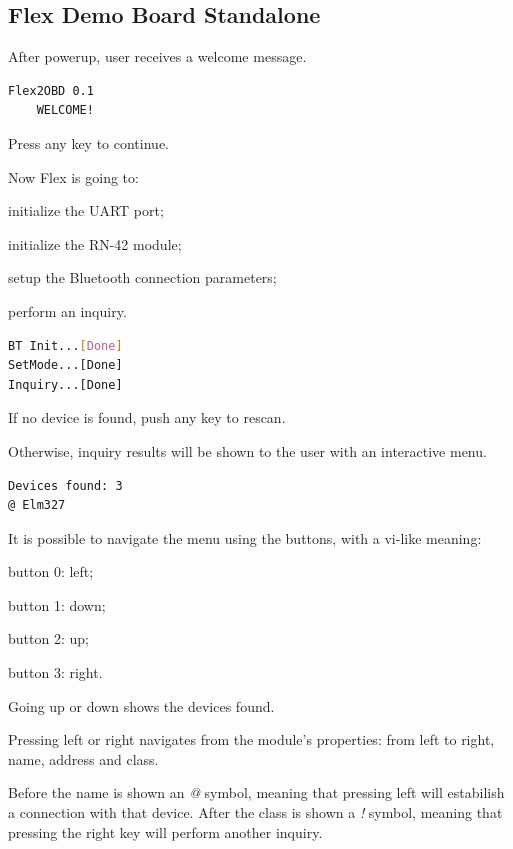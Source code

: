\documentclass[twoside]{article}
\begin{document}
\begin{multicols}{2}
\subsection{Flex Demo Board Standalone}

After powerup, user receives a welcome message.

\begin{lstlisting}[language=bash]
  Flex2OBD 0.1
    WELCOME!
\end{lstlisting}

Press any key to continue.

Now Flex is going to:
\begin{compactitem}
  \item initialize the UART port;
  \item initialize the RN-42 module;
  \item setup the Bluetooth connection parameters;
  \item perform an inquiry.
\end{compactitem}

\begin{lstlisting}[language=bash]
BT Init...[Done]
SetMode...[Done]
Inquiry...[Done]
\end{lstlisting}

If no device is found, push any key to rescan.

Otherwise, inquiry results will be shown to the user with an interactive menu. 

\begin{lstlisting}[language=bash]
Devices found: 3
@ Elm327
\end{lstlisting}

It is possible to navigate the menu using the buttons, with a vi-like meaning:
\begin{compactitem}
  \item button 0: left;
  \item button 1: down;
  \item button 2: up;
  \item button 3: right.
\end{compactitem}

Going up or down shows the devices found.

Pressing left or right navigates from the module's properties: from left to right, name, address and class.

Before the name is shown an \emph{@} symbol, meaning that pressing left will estabilish a connection with that device.
After the class is shown a \emph{!} symbol, meaning that pressing the right key will perform another inquiry.


\end{multicols}
\end{document}
